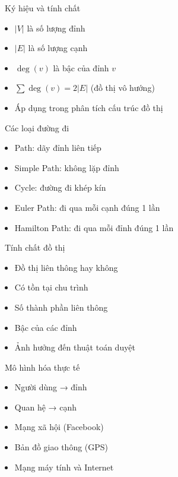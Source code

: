 \documentclass{beamer}
\begin{document}
\begin{frame}{\faSquareRootAlt\ Ký hiệu và tính chất}
\begin{tcolorbox}
\begin{itemize}
\item $|V|$ là số lượng đỉnh
\item $|E|$ là số lượng cạnh
\item $\deg(v)$ là bậc của đỉnh $v$
\item $\sum \deg(v) = 2|E|$ (đồ thị vô hướng)
\item Áp dụng trong phân tích cấu trúc đồ thị
\end{itemize}
\end{tcolorbox}
\end{frame}

\begin{frame}{\faRoute\ Các loại đường đi}
\begin{tcolorbox}
\begin{itemize}
\item Path: dãy đỉnh liên tiếp
\item Simple Path: không lặp đỉnh
\item Cycle: đường đi khép kín
\item Euler Path: đi qua mỗi cạnh đúng 1 lần
\item Hamilton Path: đi qua mỗi đỉnh đúng 1 lần
\end{itemize}
\end{tcolorbox}
\end{frame}

\begin{frame}{\faCheckCircle\ Tính chất đồ thị}
\begin{tcolorbox}
\begin{itemize}
\item Đồ thị liên thông hay không
\item Có tồn tại chu trình
\item Số thành phần liên thông
\item Bậc của các đỉnh
\item Ảnh hưởng đến thuật toán duyệt
\end{itemize}
\end{tcolorbox}
\end{frame}

\begin{frame}{\faNetworkWired\ Mô hình hóa thực tế}
\begin{tcolorbox}
\begin{itemize}
\item Người dùng → đỉnh
\item Quan hệ → cạnh
\item Mạng xã hội (Facebook)
\item Bản đồ giao thông (GPS)
\item Mạng máy tính và Internet
\end{itemize}
\end{tcolorbox}
\end{frame}
\end{document}
